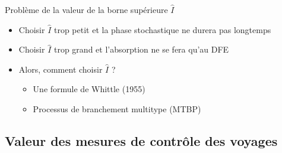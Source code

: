 \documentclass[aspectratio=169]{beamer}\usepackage[]{graphicx}\usepackage[]{xcolor}
\begin{document}

\begin{frame}{Problème de la valeur de la borne supérieure $\hat I$}
  \begin{itemize}
    \item Choisir $\hat I$ trop petit et la phase stochastique ne durera pas longtemps
    \vfill
    \item Choisir $\hat I$ trop grand et l'absorption ne se fera qu'au DFE
    \vfill
    \item Alors, comment choisir $\hat I$ ?
    \begin{itemize}
      \item Une formule de Whittle (1955) \nocite{whittle1955}
      \item Processus de branchement multitype (MTBP)
    \end{itemize}
  \end{itemize}
\end{frame}

\subsection{Valeur des mesures de contrôle des voyages}
\end{document}
